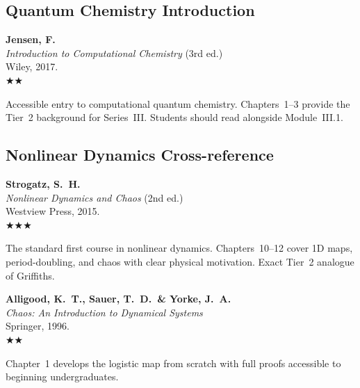 \documentclass[11pt,a4paper]{article}
\newcommand{\essential}{$\bigstar\bigstar\bigstar$}
\newcommand{\recommended}{$\bigstar\bigstar$}
\newenvironment{bibentry}[1]{%
  \begin{tcolorbox}[entrybox=#1, top=4pt, bottom=4pt]%
}{%
  \end{tcolorbox}\smallskip%
}
\begin{document}
\subsection{Quantum Chemistry Introduction}

\begin{bibentry}{t2light}
\textbf{Jensen, F.}\\
\textit{Introduction to Computational Chemistry} (3rd ed.)\\
Wiley, 2017.\\[4pt]
\recommended\\[4pt]
\begin{tcolorbox}[annotbox]
Accessible entry to computational quantum chemistry. Chapters~1--3 provide the Tier~2
background for Series~III. Students should read alongside Module~III.1.
\end{tcolorbox}
\end{bibentry}

\subsection{Nonlinear Dynamics Cross-reference}

\begin{bibentry}{t2light}
\textbf{Strogatz, S.~H.}\\
\textit{Nonlinear Dynamics and Chaos} (2nd ed.)\\
Westview Press, 2015.\\[4pt]
\essential\\[4pt]
\begin{tcolorbox}[annotbox]
The standard first course in nonlinear dynamics. Chapters~10--12 cover 1D maps,
period-doubling, and chaos with clear physical motivation. Exact Tier~2 analogue
of Griffiths.
\end{tcolorbox}
\end{bibentry}

\begin{bibentry}{t2light}
\textbf{Alligood, K.~T., Sauer, T.~D.\ \& Yorke, J.~A.}\\
\textit{Chaos: An Introduction to Dynamical Systems}\\
Springer, 1996.\\[4pt]
\recommended\\[4pt]
\begin{tcolorbox}[annotbox]
Chapter~1 develops the logistic map from scratch with full proofs accessible to
beginning undergraduates.
\end{tcolorbox}
\end{bibentry}
\end{document}
